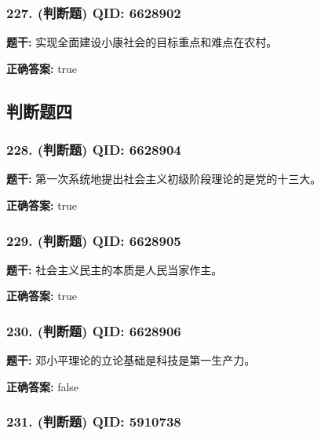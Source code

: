 \documentclass[12pt,UTF8]{ctexart}
\begin{document}
\subsubsection*{227. (判断题) \small QID: 6628902}

\textbf{题干:}
实现全面建设小康社会的目标重点和难点在农村。

\textbf{正确答案:}
true

\vspace{0.3em}\hrulefill\vspace{0.7em}

\subsection*{判断题四}

\subsubsection*{228. (判断题) \small QID: 6628904}

\textbf{题干:}
第一次系统地提出社会主义初级阶段理论的是党的十三大。

\textbf{正确答案:}
true

\vspace{0.3em}\hrulefill\vspace{0.7em}

\subsubsection*{229. (判断题) \small QID: 6628905}

\textbf{题干:}
社会主义民主的本质是人民当家作主。

\textbf{正确答案:}
true

\vspace{0.3em}\hrulefill\vspace{0.7em}

\subsubsection*{230. (判断题) \small QID: 6628906}

\textbf{题干:}
邓小平理论的立论基础是科技是第一生产力。

\textbf{正确答案:}
false

\vspace{0.3em}\hrulefill\vspace{0.7em}

\subsubsection*{231. (判断题) \small QID: 5910738}
\end{document}
